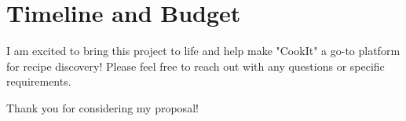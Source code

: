\documentclass{article}
\begin{document}
\section*{Timeline and Budget}

I am excited to bring this project to life and help make "CookIt" a go-to platform for recipe discovery! Please feel free to reach out with any questions or specific requirements.

\bigskip

\noindent
Thank you for considering my proposal!
\end{document}
